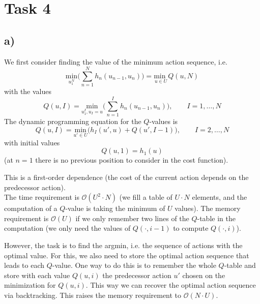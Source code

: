 \documentclass[%
   11pt,              %
   ngerman,           %
   a4paper,           %
   DIV11,             %
]{scrartcl}%
\begin{document}
\section*{Task 4}
\subsection*{a)}
We first consider finding the value of the minimum action sequence, i.e.
\begin{equation*}
	\underset{u_1^N}{\text{min}} \bigg(\sum_{n=1}^N h_n(u_{n-1},u_n)\bigg) = \underset{u \in U}{\text{min }} Q(u,N)
\end{equation*}
with the values
\begin{equation*}
	Q(u,I) = \underset{u_1^I, u_I = u}{\text{min}}\bigg(\sum_{n=1}^I h_n(u_{n-1},u_n)\bigg), \qquad I = 1,\ldots, N
\end{equation*}
The dynamic programming equation for the $Q$-values is
\begin{equation*}
	Q(u,I) = \underset{u' \in U}{\text{min}}\bigg(h_I(u',u) + Q(u', I-1)\bigg), \qquad I = 2,\ldots,N
\end{equation*}
with initial values
\begin{equation*}
	Q(u,1) = h_1(u)
\end{equation*}
(at $n=1$ there is no previous position to consider in the cost function).\par
This is a first-order dependence (the cost of the current action depends on the predecessor action). \\
The time requirement is $\mathcal{O}(U^2 \cdot N)$ (we fill a table of $U\cdot N$ elements, and the computation of a $Q$-value is taking the minimum of $U$ values). The memory requirement is $\mathcal{O}(U)$ if we only remember two lines of the $Q$-table in the computation (we only need the values of $Q(\cdot, i-1)$ to compute $Q(\cdot, i)$). \par
However, the task is to find the argmin, i.e. the sequence of actions with the optimal value. For this, we also need to store the optimal action sequence that leads to each $Q$-value. One way to do this is to remember the whole $Q$-table and store with each value $Q(u,i)$ the predecessor action $u'$ chosen on the minimization for $Q(u,i)$. This way we can recover the optimal action sequence via backtracking. This raises the memory requirement to $\mathcal{O}(N \cdot U)$.
\end{document}
